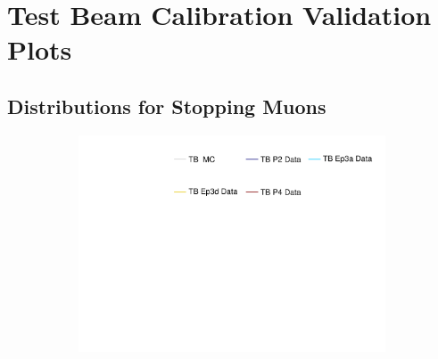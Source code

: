 \chapter{Test Beam Calibration Validation Plots}\label{sec:AppTBCalibValid}

\section{Distributions for Stopping Muons}

\begin{figure}[!ht]
  \begin{subfigure}{\textwidth}
  \centering
    \includegraphics[height=0.2\linewidth]{essentialsec_tb/legend.pdf}
  \end{subfigure}
  \vspace*{2mm}
  

\end{figure}
